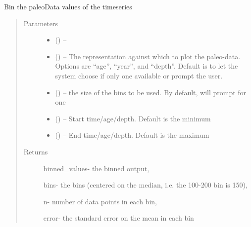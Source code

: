 \documentclass[letterpaper,10pt,english]{sphinxmanual}
\begin{document}
\begin{fulllineitems}
\label{\detokenize{Main:pyleoclim.binTs}}
Bin the paleoData values of the timeseries
\begin{quote}\begin{description}
\item[{Parameters}] \leavevmode\begin{itemize}
\item {} 
\sphinxstyleliteralstrong{, } () -- 

\item {} 
 () -- The representation against which to plot the paleo-data.
Options are ``age'', ``year'', and ``depth''. Default is to let the
system  choose if only one available or prompt the user.

\item {} 
 () -- the size of the bins to be used. By default,
will prompt for one

\item {} 
 () -- Start time/age/depth. Default is the minimum

\item {} 
 () -- End time/age/depth. Default is the maximum

\end{itemize}

\item[{Returns}] \leavevmode

binned\_values- the binned output,

bins-  the bins (centered on the median, i.e. the 100-200 bin is 150),

n-  number of data points in each bin,

error- the standard error on the mean in each bin


\end{description}\end{quote}

\end{fulllineitems}
\end{document}
